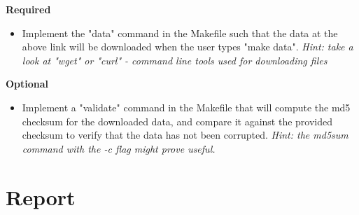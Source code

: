 \documentclass[11pt]{article}
\begin{document}
{\bf Required}
\begin{itemize}
  \item Implement the "data" command in the Makefile such that the data at the 
        above link will be downloaded when the user types "make data". 
        \textit{Hint: take a look at "wget" or "curl" - command line tools 
                used for downloading files}
\end{itemize}

{\bf Optional}
\begin{itemize}
  \item Implement a "validate" command in the Makefile that will compute the
        md5 checksum for the downloaded data, and compare it against the 
        provided checksum to verify that the data has not been corrupted.
        \textit{Hint: the md5sum command with the -c flag might prove useful.}
\end{itemize}

\section*{Report}
\end{document}
